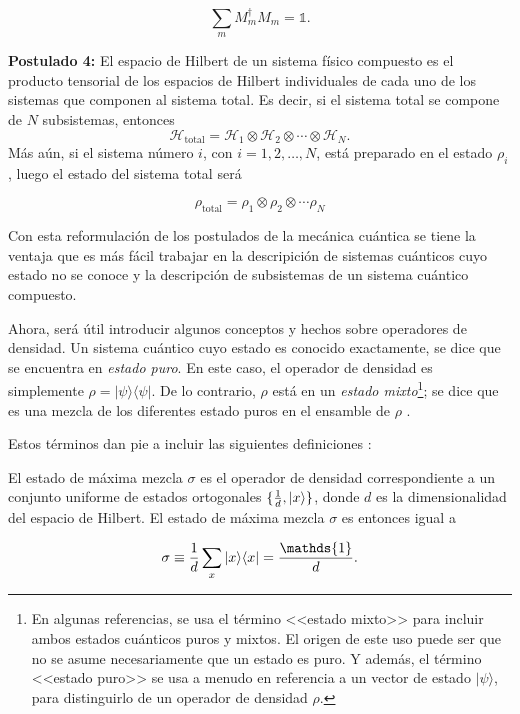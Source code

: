 \begin{equation}\label{completitud3postulate}
	  	\sum_m M_m^\dagger M_m=\mathds{1}.
\end{equation}

\textbf{Postulado 4:} El espacio de Hilbert de un sistema físico compuesto es el producto tensorial de los espacios de Hilbert individuales de cada uno de los sistemas que componen al sistema total. Es decir, si el sistema total se compone de $N$ subsistemas, entonces
\begin{equation}\label{Htotal4postulado}
	\mathcal{H}_{\text{total}}=\mathcal{H}_1\otimes \mathcal{H}_2\otimes \cdots \otimes \mathcal{H}_N.
\end{equation}
  Más aún, si el sistema número $i$, con $i=1,2,\ldots,N$, está preparado en el estado $\rho_i$, luego el estado del sistema total será 

\begin{equation}\label{rhototal4postulado}
	\rho_{\text{total}}=\rho_1\otimes \rho_2 \otimes \cdots \rho_N
\end{equation}


\setlength{\leftskip}{0pt}

Con esta reformulación de los postulados de la mecánica cuántica se tiene la ventaja que es más fácil trabajar en la descripición de sistemas cuánticos cuyo estado no se conoce y la descripción de subsistemas de un sistema cuántico compuesto.


Ahora, será útil introducir algunos conceptos y hechos sobre operadores de densidad. Un sistema cuántico cuyo estado es conocido exactamente, se dice que se encuentra en \textit{estado puro}. En este caso, el operador de densidad es simplemente $\rho=|\psi \rangle \langle \psi|$. De lo contrario, $\rho$ está en un \textit{estado mixto}\footnote{En algunas referencias, se  usa el término <<estado mixto>> para incluir ambos estados cuánticos puros y mixtos. El origen de este uso puede ser que no se asume necesariamente que un estado es puro. Y además, el término <<estado puro>> se usa a menudo en referencia a un vector de estado $|\psi\rangle $, para distinguirlo de un operador de densidad	$\rho$. }; se dice que es una mezcla de los diferentes estado puros en el ensamble de $\rho$ {\cite{nielsen_chuang_2010}}. 

Estos términos dan pie a incluir las siguientes definiciones {\cite{wilde2011classical}}:

\begin{definition} El estado de máxima mezcla $\sigma$ es el operador de densidad correspondiente a un conjunto uniforme de estados ortogonales $\{\frac{1}{d},|x\rangle\}$, donde $d$ es la dimensionalidad del espacio de Hilbert. El estado de máxima mezcla $\sigma$ es entonces igual a
	
	
	\begin{equation}\label{maximallyMixedState}
		\sigma \equiv \dfrac{1}{d}\sum_x|x\rala x|=\dfrac{\mathds{1}}{d}.
	\end{equation}
\end{definition}


